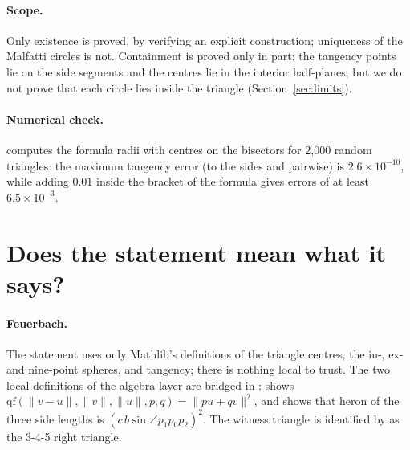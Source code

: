 \documentclass[11pt]{article}
\theoremstyle{definition}
\theoremstyle{remark}
\begin{document}
\paragraph{Scope.} Only existence is proved, by verifying an explicit construction;
uniqueness of the Malfatti circles is not. Containment is proved only in part: the tangency
points lie on the side segments and the centres lie in the interior half-planes, but we do not
prove that each circle lies inside the triangle (Section~\ref{sec:limits}).

\paragraph{Numerical check.}  computes the formula radii with centres
on the bisectors for 2{,}000 random triangles: the maximum tangency error (to the sides and
pairwise) is $2.6\times10^{-10}$, while adding $0.01$ inside the bracket of the formula gives errors
of at least $6.5\times10^{-3}$.

\section{Does the statement mean what it says?}\label{sec:correct}

\paragraph{Feuerbach.} The statement uses only Mathlib's definitions of the triangle centres, the
in-, ex- and nine-point spheres, and tangency; there is nothing local to trust. The two local
definitions of the algebra layer are bridged in :
 shows $\mathrm{qf}(\|v-u\|,\|v\|,\|u\|,p,q)=\|pu+qv\|^2$, and
 shows that $\mathrm{heron}$ of the three side lengths is
$(c\,b\sin\angle p_1p_0p_2)^2$. The witness triangle  is identified by
 as the 3-4-5 right triangle.
\end{document}
